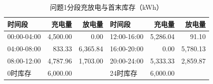 \begin{table}[H]\centering\small\caption{问题1分段充放电与首末库存（kWh）}\label{tab:q1b}
\begin{tabular}{lrrlrr}\toprule
时间段 & 充电量 & 放电量 & 时间段 & 充电量 & 放电量\\\midrule
00:00-04:00 & 4,500.00 & 0.00 & 12:00-16:00 & 5,286.04 & 91.10\\
04:00-08:00 & 833.33 & 6,365.84 & 16:00-20:00 & 0.00 & 5,780.13\\
08:00-12:00 & 4,787.96 & 1,703.00 & 20:00-24:00 & 5,333.33 & 2,859.87\\
0时库存 & 6,000.00 &  & 24时库存 & 6,000.00 & \\
\bottomrule\end{tabular}\end{table}
